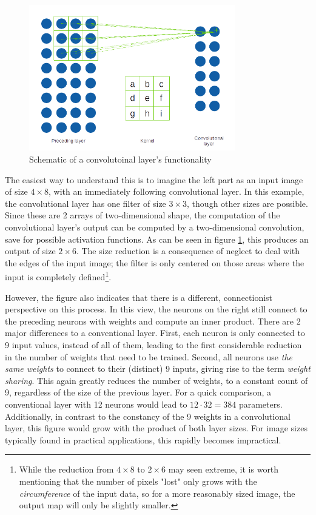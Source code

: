 \documentclass[11pt, a4paper]{article}
\begin{document}
\begin{figure}[htb]
	\centering
	\includegraphics[width=0.8\textwidth]{images/convolution_layer.png}
	\caption{Schematic of a convolutoinal layer's functionality}
	\label{fig:convolutional-layer}
\end{figure}

The easiest way to understand this is to imagine the left part as an input image of size $4 \times 8$, with an immediately following convolutional layer. In this example, the convolutional layer has one filter of size $3 \times 3$, though other sizes are possible. Since these are 2 arrays of two-dimensional shape, the computation of the convolutional layer's output can be computed by a two-dimensional convolution, save for possible activation functions. As can be seen in figure \ref{fig:convolutional-layer}, this produces an output of size $2 \times 6$. The size reduction is a consequence of neglect to deal with the edges of the input image; the filter is only centered on those areas where the input is completely defined\footnote{While the reduction from $4 \times 8$ to $2 \times 6$ may seen extreme, it is worth mentioning that the number of pixels "lost" only grows with the \emph{circumference} of the input data, so for a more reasonably sized image, the output map will only be slightly smaller.}.

However, the figure also indicates that there is a different, connectionist perspective on this process. In this view, the neurons on the right still connect to the preceding neurons with weights and compute an inner product. There are 2 major differences to a conventional layer. First, each neuron is only connected to 9 input values, instead of all of them, leading to the first considerable reduction in the number of weights that need to be trained. Second, all neurons use \emph{the same weights} to connect to their (distinct) 9 inputs, giving rise to the term \emph{weight sharing}. This again greatly reduces the number of weights, to a constant count of 9, regardless of the size of the previous layer. For a quick comparison, a conventional layer with 12 neurons would lead to $12 \cdot 32 = 384$ parameters. Additionally, in contrast to the constancy of the 9 weights in a convolutional layer, this figure would grow with the product of both layer sizes. For image sizes typically found in practical applications, this rapidly becomes impractical.
\end{document}
